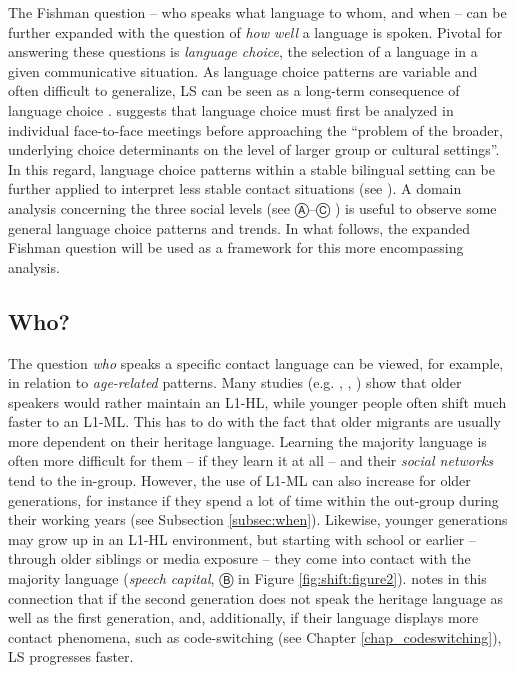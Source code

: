 \documentclass[output=paper]{langscibook}
\begin{document}
The Fishman question -- who speaks what language to whom, and when -- can be further expanded with the question of \textit{how well} a language is spoken. Pivotal for answering these questions is \emph{language choice}, the selection of a language in a given communicative situation. As language choice patterns are variable and often difficult to generalize, LS can be seen as a long-term consequence of language choice \parencite[53]{Holmes2013}. \textcite[68]{Fishman1965} suggests that language choice must first be analyzed in individual face-to-face meetings before approaching the ``problem of the broader, underlying choice determinants on the level of larger group or cultural settings''. In this regard, language choice patterns within a stable bilingual setting can be further applied to interpret less stable contact situations (see ). A domain analysis concerning the three social levels (see Ⓐ--Ⓒ ) is useful to observe some general language choice patterns and trends. In what follows, the expanded Fishman question will be used as a framework for this more encompassing analysis.

\subsection{Who?}

The question \emph{who} speaks a specific contact language can be viewed, for example, in relation to \emph{age-related} patterns. Many studies (e.g. \cite{Gal1979}, \cite{Wei2002}, \cite{Karnopp}) show that older speakers would rather maintain an L1-HL, while younger people often shift much faster to an L1-ML. This has to do with the fact that older migrants are usually more dependent on their heritage language. Learning the majority language is often more difficult for them -- if they learn it at all -- and their \emph{social networks} tend to the in-group. However, the use of L1-ML can also increase for older generations, for instance if they spend a lot of time within the out-group during their working years (see Subsection \ref{subsec:when}). Likewise, younger generations may grow up in an L1-HL environment, but starting with school or earlier -- through older siblings or media exposure -- they come into contact with the majority language (\emph{speech capital}, Ⓑ in Figure \ref{fig:shift:figure2}). \textcite[84--85]{Pauwels2016} notes in this connection that if the second generation does not speak the heritage language as well as the first generation, and, additionally, if their language displays more contact phenomena, such as code-switching (see Chapter \ref{chap_codeswitching}), LS progresses faster.
\end{document}
